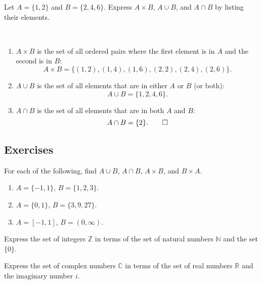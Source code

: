 \begin{example}
Let $ A=\{1,2\} $ and $ B=\{2,4,6\} $. Express $ A\times B $, $ A\cup B $, and $ A\cap B $ by listing their elements.
\end{example}
\begin{solution}~
\begin{enumerate}
    \item $ A\times B $ is the set of all ordered pairs where the first element is in $ A $ and the second is in $ B $:
    \begin{equation*}
        A\times B=\{(1,2),(1,4),(1,6),(2,2),(2,4),(2,6)\}.
    \end{equation*}
    \item $ A\cup B $ is the set of all elements that are in either $ A $ or $ B $ (or both):
    \begin{equation*}
        A\cup B=\{1,2,4,6\}.
    \end{equation*}
    \item $ A\cap B $ is the set of all elements that are in both $ A $ and $ B $:
    \begin{equation*}
        A\cap B=\{2\}. \qedhere
    \end{equation*}
\end{enumerate}
\end{solution}

\subsection*{Exercises}

\begin{problem}\label{prb:setops}
For each of the following, find $ A\cup B $, $ A\cap B $, $ A\times B $, and $ B\times A $.
\begin{enumerate}[label=(\alph*)]
    \item $ A=\{-1,1\} $, $ B=\{1,2,3\} $.
    \item $ A=\{0,1\} $, $ B=\{3,9,27\} $.
    \item $ A=[-1,1] $, $ B=(0,\infty) $.
\end{enumerate}
\end{problem}

\begin{problem}\label{prb:Z}
Express the set of integers $ \mathbb{Z} $ in terms of the set of natural numbers $ \mathbb{N} $ and the set $ \{0\} $.
\end{problem}

\begin{problem}\label{prb:C}
Express the set of complex numbers $ \mathbb{C} $ in terms of the set of real numbers $ \mathbb{R} $ and the imaginary number $ i $.
\end{problem}

